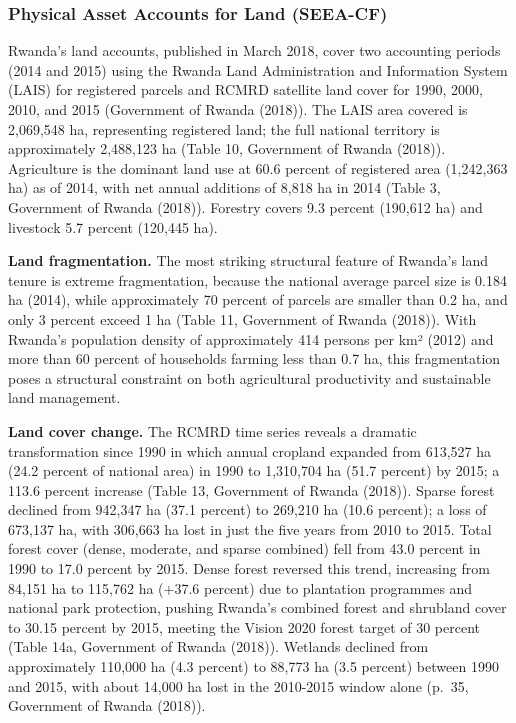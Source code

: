 \documentclass[
  letterpaper,
  DIV=11,
  numbers=noendperiod]{scrartcl}
\begin{document}
\subsubsection{Physical Asset Accounts for Land
(SEEA-CF)}\label{physical-asset-accounts-for-land-seea-cf}

Rwanda's land accounts, published in March 2018, cover two accounting
periods (2014 and 2015) using the Rwanda Land Administration and
Information System (LAIS) for registered parcels and RCMRD satellite
land cover for 1990, 2000, 2010, and 2015 (Government of Rwanda (2018)).
The LAIS area covered is 2,069,548 ha, representing registered land; the
full national territory is approximately 2,488,123 ha (Table 10,
Government of Rwanda (2018)). Agriculture is the dominant land use at
60.6 percent of registered area (1,242,363 ha) as of 2014, with net
annual additions of 8,818 ha in 2014 (Table 3, Government of Rwanda
(2018)). Forestry covers 9.3 percent (190,612 ha) and livestock 5.7
percent (120,445 ha).

\textbf{Land fragmentation.} The most striking structural feature of
Rwanda's land tenure is extreme fragmentation, because the national
average parcel size is 0.184 ha (2014), while approximately 70 percent
of parcels are smaller than 0.2 ha, and only 3 percent exceed 1 ha
(Table 11, Government of Rwanda (2018)). With Rwanda's population
density of approximately 414 persons per km² (2012) and more than 60
percent of households farming less than 0.7 ha, this fragmentation poses
a structural constraint on both agricultural productivity and
sustainable land management.

\textbf{Land cover change.} The RCMRD time series reveals a dramatic
transformation since 1990 in which annual cropland expanded from 613,527
ha (24.2 percent of national area) in 1990 to 1,310,704 ha (51.7
percent) by 2015; a 113.6 percent increase (Table 13, Government of
Rwanda (2018)). Sparse forest declined from 942,347 ha (37.1 percent) to
269,210 ha (10.6 percent); a loss of 673,137 ha, with 306,663 ha lost in
just the five years from 2010 to 2015. Total forest cover (dense,
moderate, and sparse combined) fell from 43.0 percent in 1990 to 17.0
percent by 2015. Dense forest reversed this trend, increasing from
84,151 ha to 115,762 ha (+37.6 percent) due to plantation programmes and
national park protection, pushing Rwanda's combined forest and shrubland
cover to 30.15 percent by 2015, meeting the Vision 2020 forest target of
30 percent (Table 14a, Government of Rwanda (2018)). Wetlands declined
from approximately 110,000 ha (4.3 percent) to 88,773 ha (3.5 percent)
between 1990 and 2015, with about 14,000 ha lost in the 2010-2015 window
alone (p.~35, Government of Rwanda (2018)).
\end{document}
